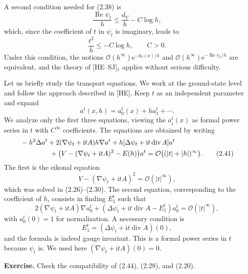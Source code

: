 \documentclass[11pt]{article}
\newcommand{\Ree}{\operatorname{Re}}
\newcommand{\OO}{\mathcal O}
\newcommand{\ii}{\mathrm{i}}
\newcommand{\e}{\mathrm{e}}
\begin{document}
A second condition needed for (2.38) is
\begin{equation}
\frac{\Ree\psi_t}{h}\le\frac{d_V}{h}-C\log h,
\tag{2.39}
\end{equation}
which, since the coefficient of $t$ in $\psi_t$ is imaginary, leads to
\begin{equation}
\frac{t^2}{h}\le -C\log h,
\qquad C>0.
\tag{2.40}
\end{equation}
Under this condition, the notions $\OO(h^\infty)\e^{-d_V(x)/h}$ and $\OO(h^\infty)\e^{-\Ree\psi_t/h}$ are equivalent, and the theory of [HE--SJ]$_1$ applies without serious difficulty.

Let us briefly study the transport equations. We work at the ground-state level and follow the approach described in [HE]. Keep $t$ as an independent parameter and expand
\[
a^t(x,h)=a_0^t(x)+ha_1^t+\cdots.
\]
We analyze only the first three equations, viewing the $a_i^t(x)$ as formal power series in $t$ with $C^\infty$ coefficients. The equations are obtained by writing
\begin{align}
&-h^2\Delta a^t+2(\nabla\psi_t+\ii tA)h\nabla a^t
+h[\Delta\psi_t+\ii t\operatorname{div}A]a^t
\notag\\
&\hspace{1.5cm}
+\bigl(V-(\nabla\psi_t+\ii tA)^2-E(h)\bigr)a^t
=\OO\bigl((|t|+|h|)^\infty\bigr).
\tag{2.41}
\end{align}
The first is the eikonal equation
\begin{equation}
V-(\nabla\psi_t+\ii tA)^2=\OO(|t|^\infty),
\tag{2.42}
\end{equation}
which was solved in (2.26)--(2.30).
The second equation, corresponding to the coefficient of $h$, consists in finding $E_1^t$ such that
\begin{equation}
2(\nabla\psi_t+\ii tA)\nabla a_0^t
+(\Delta\psi_t+\ii t\operatorname{div}A-E_1^t)a_0^t
=\OO(|t|^\infty),
\tag{2.43}
\end{equation}
with $a_0^t(0)=1$ for normalization.
A necessary condition is
\begin{equation}
E_1^t=(\Delta\psi_t+\ii t\operatorname{div}A)(0),
\tag{2.44}
\end{equation}
and the formula is indeed gauge invariant. This is a formal power series in $t$ because $\psi_t$ is. We used here $(\nabla\psi_t+\ii tA)(0)=0$.

\noindent\textbf{Exercise.}
Check the compatibility of (2.44), (2.28), and (2.20).
\end{document}
